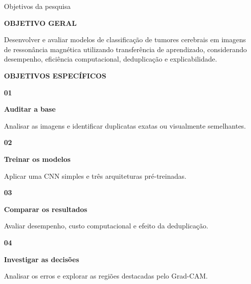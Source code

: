 \documentclass[aspectratio=169,11pt,t]{beamer}
\begin{document}
\begin{frame}{Objetivos da pesquisa}
\vspace{0.5mm}
\begin{tcolorbox}[tint,fontupper=\footnotesize\color{navy}]
{\scriptsize\bfseries\color{teal}OBJETIVO GERAL\par}
\vspace{0.6mm}
Desenvolver e avaliar modelos de classificação de tumores cerebrais em imagens de ressonância magnética utilizando transferência de aprendizado, considerando desempenho, eficiência computacional, deduplicação e explicabilidade.
\end{tcolorbox}
\vspace{2mm}
{\scriptsize\bfseries\color{teal}OBJETIVOS ESPECÍFICOS\par}
\vspace{0.8mm}
\begin{tcbraster}[raster columns=4,raster equal height,raster column skip=3mm]
\begin{tcolorbox}[card,top=1.6mm,bottom=1.6mm,left=2.2mm,right=2.2mm,fontupper=\footnotesize\color{navy}]
{\fontsize{13}{15}\selectfont\bfseries\color{teal}01\par}\vspace{0.4mm}
\textbf{Auditar a base}\par\vspace{0.4mm}
Analisar as imagens e identificar duplicatas exatas ou visualmente semelhantes.
\end{tcolorbox}
\begin{tcolorbox}[card,top=1.6mm,bottom=1.6mm,left=2.2mm,right=2.2mm,fontupper=\footnotesize\color{navy}]
{\fontsize{13}{15}\selectfont\bfseries\color{teal}02\par}\vspace{0.4mm}
\textbf{Treinar os modelos}\par\vspace{0.4mm}
Aplicar uma CNN simples e três arquiteturas pré-treinadas.
\end{tcolorbox}
\begin{tcolorbox}[card,top=1.6mm,bottom=1.6mm,left=2.2mm,right=2.2mm,fontupper=\footnotesize\color{navy}]
{\fontsize{13}{15}\selectfont\bfseries\color{teal}03\par}\vspace{0.4mm}
\textbf{Comparar os resultados}\par\vspace{0.4mm}
Avaliar desempenho, custo computacional e efeito da deduplicação.
\end{tcolorbox}
\begin{tcolorbox}[card,top=1.6mm,bottom=1.6mm,left=2.2mm,right=2.2mm,fontupper=\footnotesize\color{navy}]
{\fontsize{13}{15}\selectfont\bfseries\color{teal}04\par}\vspace{0.4mm}
\textbf{Investigar as decisões}\par\vspace{0.4mm}
Analisar os erros e explorar as regiões destacadas pelo Grad-CAM.
\end{tcolorbox}
\end{tcbraster}
\end{frame}
\end{document}
